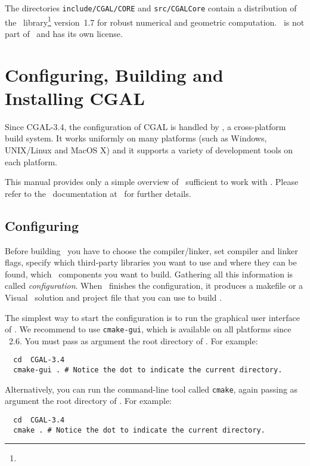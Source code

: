 The directories \texttt{include/CGAL/CORE} and \texttt{src/CGALCore} contain a
distribution of the \core\ library\footnote{\corepage} version~1.7 for
robust numerical and geometric computation. \core\ is not part of
\cgal\ and has its own license.



\section{Configuring, Building and Installing CGAL}

Since CGAL-3.4, the configuration of CGAL is handled by \cmake, a
cross-platform build system. It works uniformly on many platforms (such as
Windows, UNIX/Linux and  MacOS X) and it supports a variety of development
tools on each platform.

This manual provides only a simple 
overview of \cmake\ sufficient to work with \cgal. Please refer to the 
\cmake\ documentation at \cmakepage\ for further details.

\subsection{Configuring \cgal}

Before building \cgal\ you have to choose the compiler/linker, 
set compiler and linker  flags, specify which
third-party libraries you want to use and where they can be found, 
which \cgal\ components you want to build. Gathering
all this information is called {\em configuration}. When
\cmake\ finishes the configuration, it produces a makefile or a Visual \CC\ 
solution and project file that you can use to build \cgal.


The simplest way to start the configuration is to run the graphical
user interface of \cmake. We recommend to use \texttt{cmake-gui}, which
is available on all platforms since \cmake\ 2.6.   You must pass as 
argument the root directory of \cgal. For example:

{\ccTexHtml{\scriptsize}{}
\begin{verbatim}
  cd  CGAL-3.4
  cmake-gui . # Notice the dot to indicate the current directory.
\end{verbatim}
}

Alternatively, you can run the command-line tool called
\texttt{cmake}, again passing as argument the root directory of
\cgal. For example:

{\ccTexHtml{\scriptsize}{}
\begin{verbatim}
  cd  CGAL-3.4
  cmake . # Notice the dot to indicate the current directory.
\end{verbatim}
}


